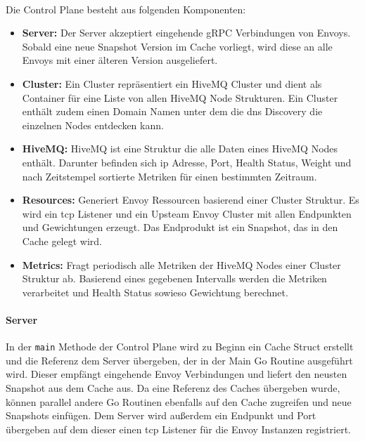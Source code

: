 \\
Die Control Plane besteht aus folgenden Komponenten:%
\begin{itemize}
  \item \textbf{Server:} Der Server akzeptiert eingehende gRPC Verbindungen von Envoys. Sobald eine neue Snapshot Version im Cache vorliegt, wird diese an alle Envoys mit einer älteren Version ausgeliefert.
  \item \textbf{Cluster:} Ein Cluster repräsentiert ein HiveMQ Cluster und dient als Container für eine Liste von allen HiveMQ Node Strukturen. Ein Cluster enthält zudem einen Domain Namen unter dem die \ac{dns} Discovery die einzelnen Nodes entdecken kann.
  \item \textbf{HiveMQ:} HiveMQ ist eine Struktur die alle Daten eines HiveMQ Nodes enthält. Darunter befinden sich \ac{ip} Adresse, Port, Health Status, Weight und nach Zeitstempel sortierte Metriken für einen bestimmten Zeitraum.
  \item \textbf{Resources:} Generiert Envoy Ressourcen basierend einer Cluster Struktur. Es wird ein \ac{tcp} Listener und ein Upsteam Envoy Cluster mit allen Endpunkten und Gewichtungen erzeugt. Das Endprodukt ist ein Snapshot, das in den Cache gelegt wird.
  \item \textbf{Metrics:} Fragt periodisch alle Metriken der HiveMQ Nodes einer Cluster Struktur ab. Basierend eines gegebenen Intervalls werden die Metriken verarbeitet und Health Status sowieso Gewichtung berechnet.
\end{itemize}

\paragraph{Server}
In der \verb|main| Methode der Control Plane wird zu Beginn ein Cache Struct erstellt und die Referenz dem Server übergeben, der in der Main Go Routine ausgeführt wird. Dieser empfängt eingehende Envoy Verbindungen und liefert den neusten Snapshot aus dem Cache aus. Da eine Referenz des Caches übergeben wurde, können parallel andere Go Routinen ebenfalls auf den Cache zugreifen und neue Snapshots einfügen. Dem Server wird au{\ss}erdem ein Endpunkt und Port übergeben auf dem dieser einen \ac{tcp} Listener für die Envoy Instanzen registriert.


